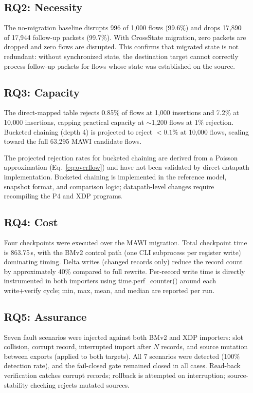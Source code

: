 \documentclass[10pt, conference, compsoc]{IEEEtran}
\begin{document}
\subsection{RQ2: Necessity}
\label{subsec:rq2}
The no-migration baseline disrupts 996 of 1{,}000 flows (99.6\%) and drops
17{,}890 of 17{,}944 follow-up packets (99.7\%). With CrossState migration,
zero packets are dropped and zero flows are disrupted. This confirms that
migrated state is not redundant: without synchronized state, the destination
target cannot correctly process follow-up packets for flows whose state was
established on the source.

\subsection{RQ3: Capacity}
\label{subsec:rq3}
The direct-mapped table rejects 0.85\% of flows at 1{,}000 insertions and 7.2\%
at 10{,}000 insertions, capping practical capacity at $\sim$1{,}200 flows at
1\% rejection. Bucketed chaining (depth 4) is projected to reject $<0.1\%$ at
10{,}000 flows, scaling toward the full 63{,}295 MAWI candidate flows.

The projected rejection rates for bucketed chaining are derived from a Poisson
approximation (Eq.~\ref{eq:overflow}) and have not been validated by direct
datapath implementation. Bucketed chaining is implemented in the reference
model, snapshot format, and comparison logic; datapath-level changes require
recompiling the P4 and XDP programs.

\subsection{RQ4: Cost}
\label{subsec:rq4}
Four checkpoints were executed over the MAWI migration. Total checkpoint time
is 863.75\,s, with the BMv2 control path (one CLI subprocess per register
write) dominating timing. Delta writes (changed records only) reduce the record
count by approximately 40\% compared to full rewrite. Per-record write time is
directly instrumented in both importers using time.perf\_counter() around each
write+verify cycle; min, max, mean, and median are reported per run.

\subsection{RQ5: Assurance}
\label{subsec:rq5}
Seven fault scenarios were injected against both BMv2 and XDP importers: slot
collision, corrupt record, interrupted import after $N$ records, and source
mutation between exports (applied to both targets). All 7 scenarios were
detected (100\% detection rate), and the fail-closed gate remained closed in
all cases. Read-back verification catches corrupt records; rollback is
attempted on interruption; source-stability checking rejects mutated sources.
\end{document}
